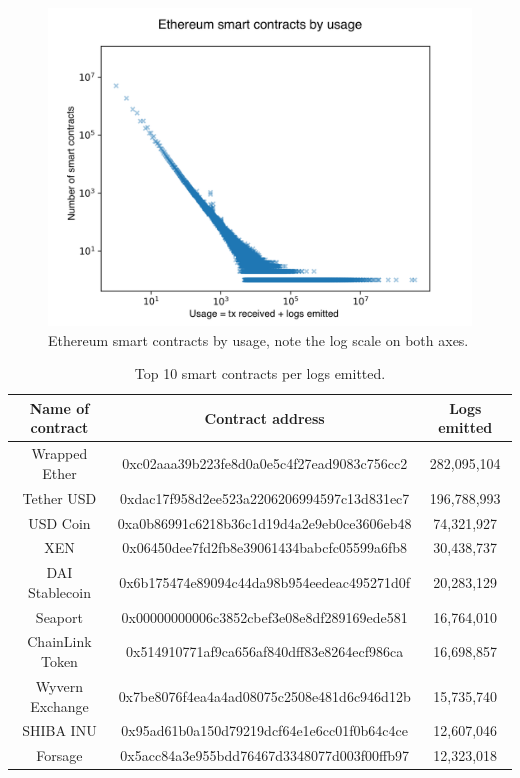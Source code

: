 \begin{figure}[!ht]
    \centering
    \includegraphics{Figures/analysis/contracts_by_usage.png}
    \caption{Ethereum smart contracts by usage, note the log scale on both axes.}
    \label{fig:contracts-by-usage}
\end{figure}

\begin{table}[!ht]
\centering
    \begin{threeparttable}
    \begin{tabular}{ c c c } 
    \toprule
    \textbf{Name of contract} & \textbf{Contract address} & \textbf{Logs emitted} \\
    \midrule
       Wrapped Ether & \small{0xc02aaa39b223fe8d0a0e5c4f27ead9083c756cc2} & 282,095,104  \\ [1.2ex]
       Tether USD  & \small{0xdac17f958d2ee523a2206206994597c13d831ec7} & 196,788,993  \\ [1.2ex]
       USD Coin & \small{0xa0b86991c6218b36c1d19d4a2e9eb0ce3606eb48} & 74,321,927  \\ [1.2ex]
       XEN & \small{0x06450dee7fd2fb8e39061434babcfc05599a6fb8} & 30,438,737  \\ [1.2ex]
       DAI Stablecoin& \small{0x6b175474e89094c44da98b954eedeac495271d0f} & 20,283,129  \\ [1.2ex]
       Seaport & \small{0x00000000006c3852cbef3e08e8df289169ede581} & 16,764,010  \\ [1.2ex]
       ChainLink Token & \small{0x514910771af9ca656af840dff83e8264ecf986ca} & 16,698,857  \\ [1.2ex]
       Wyvern Exchange & \small{0x7be8076f4ea4a4ad08075c2508e481d6c946d12b} & 15,735,740  \\ [1.2ex]
       SHIBA INU & \small{0x95ad61b0a150d79219dcf64e1e6cc01f0b64c4ce} & 12,607,046  \\ [1.2ex]
       Forsage & \small{0x5acc84a3e955bdd76467d3348077d003f00ffb97} & 12,323,018  \\ [1.2ex]  
    \bottomrule
    \end{tabular}
    \end{threeparttable}
    \caption{Top 10 smart contracts per logs emitted.}
    \label{table:top-logs-emitters}
\end{table}

